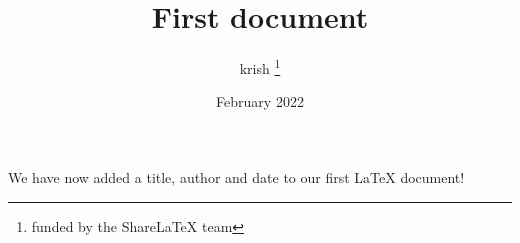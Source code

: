 \documentclass[12pt, letterpaper, twoside]{article}
\title{First document}
\author{krish \thanks{funded by the ShareLaTeX team}}
\date{February 2022}
\begin{document}
 
\maketitle
 
We have now added a title, author and date to our first \LaTeX{} document!
 
\end{document}
